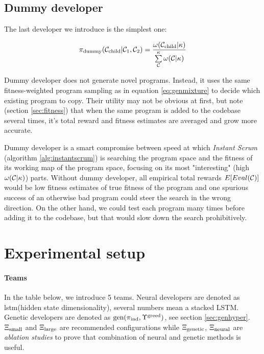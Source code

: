 \newpage \subsection{Dummy developer}

The last developer we introduce is the simplest one:

\begin{equation}
    \pi_\text{dummy}(\mathcal{C}_\text{child}|\mathcal{C}_1,\mathcal{C}_2) = 
    \frac{\omega(\mathcal{C}_\text{child}|\kappa)}{\sum\limits_{\mathcal{C}}^{\kappa} \omega(\mathcal{C}|\kappa)} 
    \label{eq:dummy}
\end{equation}

Dummy developer does not generate novel programs.
Instead, it uses the same fitness-weighted program sampling as in equation \ref{eq:genmixture} to decide which existing program to copy.
Their utility may not be obvious at first, but note (section \ref{sec:fitness}) that when the same program is added to the codebase several times, it's total reward and fitness estimates are averaged and grow more accurate.

Dummy developer is a smart compromise between speed at which \emph{Instant Scrum} (algorithm \ref{alg:instantscrum}) is searching the program space and the fitness of its working map of the program space, focusing on its most "interesting" (high $\omega(\mathcal{C}|\kappa)$) parts. 
Without dummy developer, all empirical total rewards $E[Eval(\mathcal{C})]$ would be low fitness estimates of true fitness of the program and one spurious success of an otherwise bad program could steer the search in the wrong direction.
On the other hand, we could test each program many times before adding it to the codebase, but that would slow down the search prohibitively. 

\newpage
\section{Experimental setup}
\label{sec:neurogen-experiments}

\paragraph{Teams}

In the table below, we introduce 5 teams.
Neural developers are denoted as lstm(hidden state dimensionality), several numbers mean a stacked LSTM.
Genetic developers are denoted as $\text{gen}(\pi_\text{ind},\Upsilon^\text{greed})$, see section \ref{sec:genhyper}.
$\Xi_\text{small}$ and $\Xi_\text{large}$ are recommended configurations while $\Xi_\text{genetic}$, $\Xi_\text{neural}$ are \emph{ablation studies} to prove that combination of neural and genetic methods is useful.

